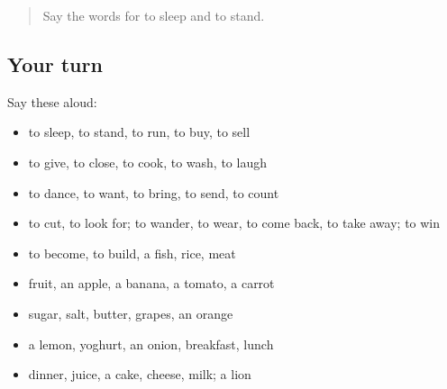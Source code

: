 \begin{quote}
Say the words for to sleep and to stand.
\end{quote}

\subsection*{Your turn}
Say these aloud:

\begin{itemize}
\raggedright
  \item to sleep, to stand, to run, to buy, to sell
  \item to give, to close, to cook, to wash, to laugh
  \item to dance, to want, to bring, to send, to count
  \item to cut, to look for; to wander, to wear, to come back, to take away; to win
  \item to become, to build, a fish, rice, meat
  \item fruit, an apple, a banana, a tomato, a carrot
  \item sugar, salt, butter, grapes, an orange
  \item a lemon, yoghurt, an onion, breakfast, lunch
  \item dinner, juice, a cake, cheese, milk; a lion
\end{itemize}

